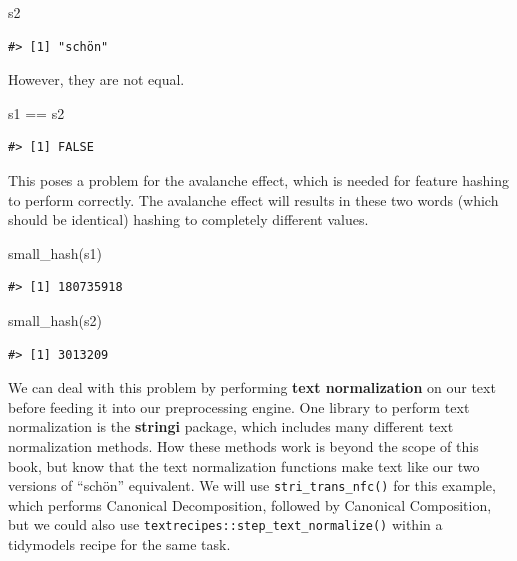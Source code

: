 \documentclass[
]{krantz}
\makeatletter
\newenvironment{Shaded}{\begin{snugshade}}{\end{snugshade}}
\newcommand{\FunctionTok}[1]{\textcolor[rgb]{0.00,0.00,0.00}{#1}}
\newcommand{\NormalTok}[1]{#1}
\newcommand{\SpecialCharTok}[1]{\textcolor[rgb]{0.00,0.00,0.00}{#1}}
\newenvironment{kframe}{%
\medskip{}
\setlength{\fboxsep}{.8em}
 \def\at@end@of@kframe{}%
 \ifinner\ifhmode%
  \def\at@end@of@kframe{\end{minipage}}%
  \begin{minipage}{\columnwidth}%
 \fi\fi%
 \def\FrameCommand##1{\hskip\@totalleftmargin \hskip-\fboxsep
 \colorbox{shadecolor}{##1}\hskip-\fboxsep
     \hskip-\linewidth \hskip-\@totalleftmargin \hskip\columnwidth}%
 \MakeFramed {\advance\hsize-\width
   \@totalleftmargin\z@ \linewidth\hsize
   \@setminipage}}%
 {\par\unskip\endMakeFramed%
 \at@end@of@kframe}
\renewenvironment{Shaded}{\begin{kframe}}{\end{kframe}}
\makeatother
\begin{document}
\begin{Shaded}
\begin{Highlighting}[]
\NormalTok{s2}
\end{Highlighting}
\end{Shaded}

\begin{verbatim}
#> [1] "schön"
\end{verbatim}

However, they are not equal.

\begin{Shaded}
\begin{Highlighting}[]
\NormalTok{s1 }\SpecialCharTok{==}\NormalTok{ s2}
\end{Highlighting}
\end{Shaded}

\begin{verbatim}
#> [1] FALSE
\end{verbatim}

This poses a problem for the avalanche effect, which is needed for feature hashing to perform correctly. The avalanche effect will results in these two words (which should be identical) hashing to completely different values.

\begin{Shaded}
\begin{Highlighting}[]
\FunctionTok{small\_hash}\NormalTok{(s1)}
\end{Highlighting}
\end{Shaded}

\begin{verbatim}
#> [1] 180735918
\end{verbatim}

\begin{Shaded}
\begin{Highlighting}[]
\FunctionTok{small\_hash}\NormalTok{(s2)}
\end{Highlighting}
\end{Shaded}

\begin{verbatim}
#> [1] 3013209
\end{verbatim}

We can deal with this problem by performing \textbf{text normalization} on our text before feeding it into our preprocessing engine.
One library to perform text normalization is the \textbf{stringi} package, which includes many different text normalization methods.
How these methods work is beyond the scope of this book, but know that the text normalization functions make text like our two versions of ``schön'' equivalent. We will use \texttt{stri\_trans\_nfc()} for this example, which performs Canonical Decomposition, followed by Canonical Composition, but we could also use \texttt{textrecipes::step\_text\_normalize()} within a tidymodels recipe for the same task.
\end{document}
